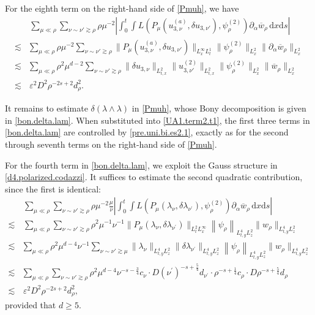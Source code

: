\documentclass[11pt,letterpaper,reqno]{amsart}
\numberwithin{equation}{section}
\theoremstyle{definition}
\theoremstyle{remark}
\begin{document}
For the eighth term on the right-hand side of \eqref{Pmuh}, we have
\begin{align}
     &\,   \sum_{\mu\ll\rho}  \sum_{\nu\sim\nu'\gtrsim\rho}   \rho \mu^{-2}  \left|  
\int_0^t\int
L
(P_\mu(
  u_{3,\nu}^{(a)},  \delta u_{3, \nu'}), \psi_\rho^{(2)})
\partial_\alpha\overline{w}_\rho\,\mathrm{d} x \mathrm{d} s 
\right|   \label{Mrho.term2.3} \\
\lesssim & \sum_{\mu\ll\rho}   \rho \mu^{-2} \sum_{\nu\sim\nu'\gtrsim\rho}   \| 
P_\mu(
  u_{3,\nu}^{(a)},  \delta u_{3, \nu'})\|_{L^\infty_x L^1_{t}}   \|\psi_\rho^{(2)}\|_{L^2_{x}} \|\partial_\alpha\overline{w}_\rho\|_{L^2_{x}} \nonumber\\
\lesssim &  \sum_{\mu\ll\rho}  \rho^2 \mu^{d-2}    \sum_{\nu\sim\nu'\gtrsim\rho}    \| 
\delta u_{3,\nu} \|_{L^2_{t,x}}   
 \| 
  u^{(2)}_{3,\nu'}\|_{L^2_{t,x}}   \|\psi_\rho^{(2)}\|_{L^2_{x}} \| \overline{w}_\rho\|_{L^2_{x}} \nonumber\\
\lesssim & \, \varepsilon^2 D^2 \rho^{-2s+2} d_\rho^2. \nonumber
\end{align}

 


It remains to estimate
\(\delta(\lambda\wedge\lambda)\) in \eqref{Pmuh}, whose Bony
decomposition is given in \eqref{bon.delta.lam}. When substituted into
\eqref{UA1.term2.t1}, the first three terms in
\eqref{bon.delta.lam} are controlled by \eqref{pre.uni.bi.es2.1}, exactly
as for the second through seventh terms on the right-hand side of
\eqref{Pmuh}.


For the fourth term in \eqref{bon.delta.lam}, we exploit the Gauss
structure in \eqref{d4.polarized.codazzi}. It suffices to estimate the
second quadratic contribution, since the first is identical:
\begin{align}
     &\,   \sum_{\mu\ll\rho} \sum_{\nu\sim\nu'\gtrsim\rho} \rho \mu^{-2} \frac{\mu}{\nu}  \left|  
\int_0^t\int
L
(P_\mu(
 \lambda_\nu, \delta\lambda_{ \nu^\prime }), \psi_\rho^{(2)})
\partial_\alpha\overline{w}_\rho\,\mathrm{d} x \mathrm{d} s  
\right|  \label{uni.critic.d=5} \\
\lesssim &\,  \sum_{\mu\ll\rho} \sum_{\nu\sim\nu'\gtrsim\rho} \rho^2 \mu^{-1} \nu^{-1}  \|P_\mu(
 \lambda_\nu, \delta\lambda_{ \nu^\prime })\|_{L^2_t L^\infty_x} \left\|   \psi_{  \rho} \right\|_{L^4_{t,y}L^2_z}   \|        w_{\rho}  \|_{ L^4_{t,y}L^2_z}    \nonumber
 \\
\lesssim &  \sum_{\mu\ll\rho}  \rho^2 \mu^{ d-4} \nu^{-1} \sum_{\nu\sim\nu'\gtrsim\mu}   \| \lambda_\nu \|_{L^4_{t,y}L^2_z}     \|\delta\lambda_{ \nu^\prime }  \|_{L^4_{t,y}L^2_z}   \left\|   \psi_{  \rho} \right\|_{L^4_{t,y}L^2_z}   \|        w_{\rho}  \|_{ L^4_{t,y}L^2_z}   \nonumber\\
\lesssim &  \sum_{\mu\ll\rho}     \sum_{\nu\sim\nu'\gtrsim\rho}     \rho^2 \mu^{d-4}  \nu^{-s-\frac 34} c_\nu \cdot D (\nu^\prime)^{-s+\frac 54} d_{\nu^\prime} \cdot \rho^{-s+\frac 14} c_\rho \cdot D \rho^{-s+\frac 54} d_\rho    \nonumber\\
\lesssim & \, \varepsilon^2 D^2 \rho^{-2s+2} d_\rho^2, \nonumber
\end{align}
provided that \( d \geq 5\). 
\end{document}
